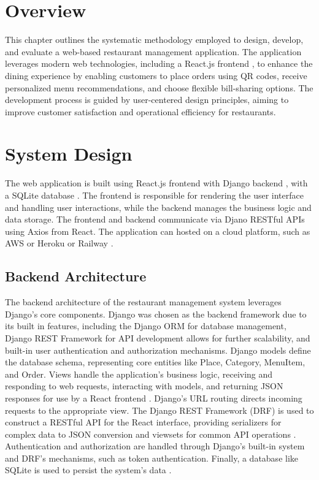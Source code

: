 \section{Overview}
This chapter outlines the systematic methodology employed to design, develop, and evaluate a web-based restaurant management application. The application leverages modern web technologies, including a React.js frontend \cite{15}, to enhance the dining experience by enabling customers to place orders using QR codes, receive personalized menu recommendations, and choose flexible bill-sharing options. The development process is guided by user-centered design principles, aiming to improve customer satisfaction and operational efficiency for restaurants.

\section{System Design}
The web application is built using React.js \cite{15}frontend with Django backend \cite{16}, with a SQLite database \cite{17}. The frontend is responsible for rendering the user interface and handling user interactions, while the backend manages the business logic and data storage. The frontend and backend communicate via Djano RESTful APIs \cite{15}using Axios \cite{18} from React. The application can hosted on a cloud platform, such as AWS \cite{23} or Heroku \cite{24} or Railway \cite{25}.


\subsection{Backend Architecture}
The backend architecture of the restaurant management system leverages Django's core components. Django was chosen as the backend framework due to its built in features, including the Django ORM for database management, Django REST Framework for API development allows for further scalability, and built-in user authentication and authorization mechanisms. Django models define the database schema, representing core entities like Place, Category, MenuItem, and Order. Views handle the application's business logic, receiving and responding to web requests, interacting with models, and returning JSON responses for use by a React frontend \cite{18}. Django's URL routing directs incoming requests to the appropriate view. The Django REST Framework (DRF) is used to construct a RESTful API for the React interface, providing serializers for complex data to JSON conversion and viewsets for common API operations \cite{20}. Authentication and authorization are handled through Django's built-in system and DRF's mechanisms, such as token authentication. Finally, a database like SQLite is used to persist the system's data \cite{17}.

